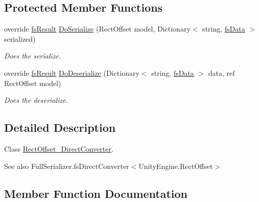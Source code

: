 \subsection*{Protected Member Functions}
\begin{DoxyCompactItemize}
\item 
override \hyperlink{struct_full_serializer_1_1fs_result}{fs\+Result} \hyperlink{class_full_serializer_1_1_internal_1_1_direct_converters_1_1_rect_offset___direct_converter_a8959a2c6c51c1d84abd288541f98145b}{Do\+Serialize} (Rect\+Offset model, Dictionary$<$ string, \hyperlink{class_full_serializer_1_1fs_data}{fs\+Data} $>$ serialized)
\begin{DoxyCompactList}\small\item\em Does the serialize. \end{DoxyCompactList}\item 
override \hyperlink{struct_full_serializer_1_1fs_result}{fs\+Result} \hyperlink{class_full_serializer_1_1_internal_1_1_direct_converters_1_1_rect_offset___direct_converter_adea41ce680e0167a48f5a92866bde8a4}{Do\+Deserialize} (Dictionary$<$ string, \hyperlink{class_full_serializer_1_1fs_data}{fs\+Data} $>$ data, ref Rect\+Offset model)
\begin{DoxyCompactList}\small\item\em Does the deserialize. \end{DoxyCompactList}\end{DoxyCompactItemize}


\subsection{Detailed Description}
Class \hyperlink{class_full_serializer_1_1_internal_1_1_direct_converters_1_1_rect_offset___direct_converter}{Rect\+Offset\+\_\+\+Direct\+Converter}. 

\begin{DoxySeeAlso}{See also}
Full\+Serializer.\+fs\+Direct\+Converter$<$\+Unity\+Engine.\+Rect\+Offset$>$


\end{DoxySeeAlso}


\subsection{Member Function Documentation}
\mbox{\label{class_full_serializer_1_1_internal_1_1_direct_converters_1_1_rect_offset___direct_converter_ab4ba48643e3a02b19257a4ab965f6a1d}} 
